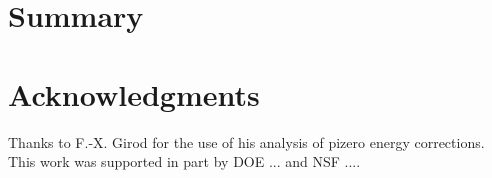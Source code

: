 \section{Summary}

\section{Acknowledgments}

Thanks to F.-X. Girod for the use of his analysis of pizero energy corrections.
This work was supported in part by DOE ... and NSF ....




